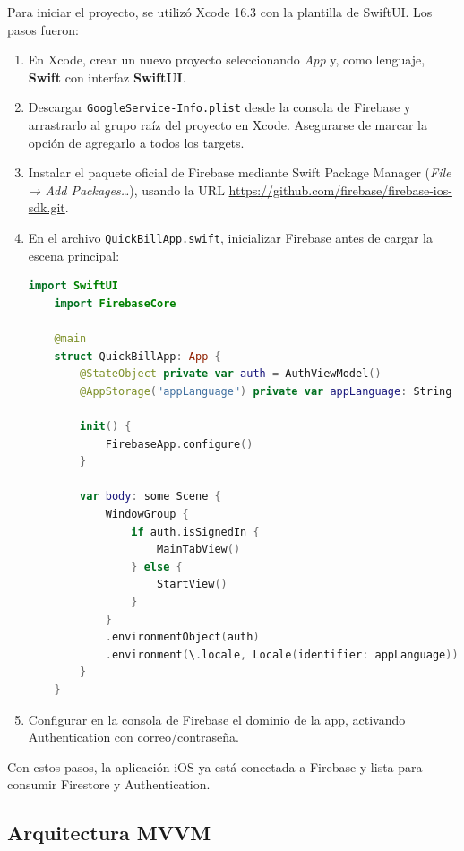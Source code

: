 \begin{large}

Para iniciar el proyecto, se utilizó Xcode 16.3 con la plantilla de SwiftUI. Los pasos fueron:

\begin{enumerate}
  \item En Xcode, crear un nuevo proyecto seleccionando \emph{App} y, como lenguaje, \textbf{Swift} con interfaz \textbf{SwiftUI}.
  \item Descargar \texttt{GoogleService-Info.plist} desde la consola de Firebase y arrastrarlo al grupo raíz del proyecto en Xcode. Asegurarse de marcar la opción de agregarlo a todos los targets.
  \item Instalar el paquete oficial de Firebase mediante Swift Package Manager (\emph{File → Add Packages…}), usando la URL \url{https://github.com/firebase/firebase-ios-sdk.git}.
  \item En el archivo \texttt{QuickBillApp.swift}, inicializar Firebase antes de cargar la escena principal:
    \begin{lstlisting}[language={swift}, caption={Inicialización de Firebase en QuickBillApp.swift}]
    import SwiftUI
    import FirebaseCore
    
    @main
    struct QuickBillApp: App {
        @StateObject private var auth = AuthViewModel()
        @AppStorage("appLanguage") private var appLanguage: String = AppLanguage.english.rawValue
        
        init() {
            FirebaseApp.configure()
        }
        
        var body: some Scene {
            WindowGroup {
                if auth.isSignedIn {
                    MainTabView()
                } else {
                    StartView()
                }
            }
            .environmentObject(auth)
            .environment(\.locale, Locale(identifier: appLanguage))
        }
    }
    \end{lstlisting}
  \item Configurar en la consola de Firebase el dominio de la app, activando Authentication con correo/contraseña.
\end{enumerate}

Con estos pasos, la aplicación iOS ya está conectada a Firebase y lista para consumir Firestore y Authentication.

\end{large}

\subsection{Arquitectura MVVM}

